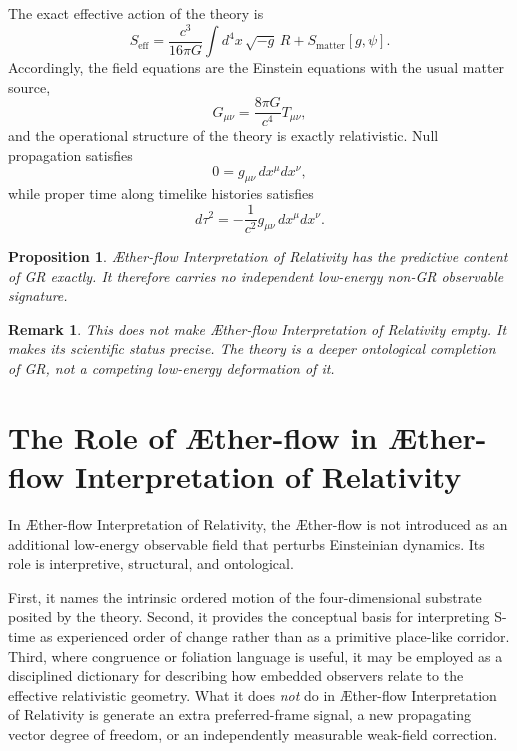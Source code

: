 \documentclass[11pt]{article}
\newcommand{\Aflow}{\AE{}ther-flow}
\newcommand{\TheoryName}{\Aflow{} Interpretation of Relativity}
\newtheorem{proposition}{Proposition}
\newtheorem{remark}{Remark}
\begin{document}
The exact effective action of the theory is
\begin{equation}
S_{\mathrm{eff}}
=
\frac{c^3}{16\pi G}\int d^4x\,\sqrt{-g}\,R
+
S_{\mathrm{matter}}[g,\psi].
\label{eq:SA}
\end{equation}
Accordingly, the field equations are the Einstein equations with the usual matter source,
\begin{equation}
G_{\mu\nu} = \frac{8\pi G}{c^4} T_{\mu\nu},
\label{eq:einstein}
\end{equation}
and the operational structure of the theory is exactly relativistic. Null propagation satisfies
\begin{equation}
0 = g_{\mu\nu}\,dx^{\mu}dx^{\nu},
\label{eq:null}
\end{equation}
while proper time along timelike histories satisfies
\begin{equation}
d\tau^2 = -\frac{1}{c^2} g_{\mu\nu}\,dx^{\mu}dx^{\nu}.
\label{eq:propertime}
\end{equation}

\begin{proposition}
\TheoryName{} has the predictive content of GR exactly. It therefore carries no independent low-energy non-GR observable signature.
\end{proposition}

\begin{remark}
This does not make \TheoryName{} empty. It makes its scientific status precise. The theory is a deeper ontological completion of GR, not a competing low-energy deformation of it.
\end{remark}

\section{The Role of \Aflow{} in \TheoryName{}}

In \TheoryName{}, the \Aflow{} is not introduced as an additional low-energy observable field that perturbs Einsteinian dynamics. Its role is interpretive, structural, and ontological.

First, it names the intrinsic ordered motion of the four-dimensional substrate posited by the theory. Second, it provides the conceptual basis for interpreting S-time as experienced order of change rather than as a primitive place-like corridor. Third, where congruence or foliation language is useful, it may be employed as a disciplined dictionary for describing how embedded observers relate to the effective relativistic geometry. What it does \emph{not} do in \TheoryName{} is generate an extra preferred-frame signal, a new propagating vector degree of freedom, or an independently measurable weak-field correction.
\end{document}
